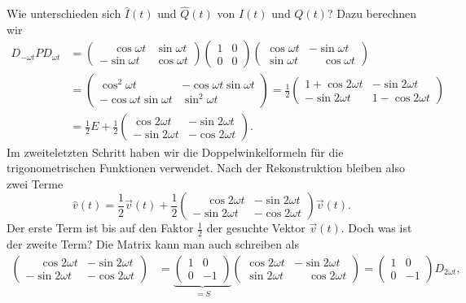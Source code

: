 Wie unterschieden sich $\hat{I}(t)$ und $\hat{Q}(t)$ von $I(t)$ und $Q(t)$?
Dazu berechnen wir
\begin{align*}
D_{-\omega t}PD_{\omega t}
&=
\begin{pmatrix}
\phantom{-}\cos\omega t & \sin\omega t \\
         - \sin\omega t & \cos\omega t
\end{pmatrix}
\begin{pmatrix} 1 & 0 \\ 0 & 0 \end{pmatrix}
\begin{pmatrix}
\cos\omega t &          - \sin\omega t \\
\sin\omega t & \phantom{-}\cos\omega t
\end{pmatrix}
\\
&=
\begin{pmatrix}
 \cos^2\omega t           & -\cos\omega t \sin\omega t \\
-\cos\omega t \sin\omega t&\sin^2\omega t
\end{pmatrix}
=
\frac12
\begin{pmatrix}
1+\cos 2\omega t &  -\sin 2\omega t \\
 -\sin 2\omega t & 1-\cos 2\omega t
\end{pmatrix}
\\
&=
\frac12 E + \frac12
\begin{pmatrix}
 \cos 2\omega t & -\sin 2\omega t \\
-\sin 2\omega t & -\cos 2\omega t
\end{pmatrix}.
\end{align*}
Im zweiteletzten Schritt haben wir die Doppelwinkelformeln für
die trigonometrischen Funktionen verwendet.
Nach der Rekonstruktion bleiben also zwei Terme
\[
\hat{v}(t)
=
\frac12\vec{v}(t)
+
\frac12
\begin{pmatrix}
\phantom{-}\cos 2\omega t & -\sin 2\omega t \\
         - \sin 2\omega t & -\cos 2\omega t
\end{pmatrix}\vec{v}(t).
\]
Der erste Term ist bis auf den Faktor $\frac12$ der gesuchte
Vektor $\vec{v}(t)$.
Doch was ist der zweite Term?
Die Matrix kann man auch schreiben als
\begin{align*}
\begin{pmatrix}
\phantom{-}\cos2\omega t&-\sin2\omega t\\
         - \sin2\omega t&-\cos2\omega t
\end{pmatrix}
&=
\underbrace{
\begin{pmatrix}
1& 0\\
0&-1
\end{pmatrix}}_{\displaystyle = S}
\begin{pmatrix}
\cos2\omega t &          - \sin2\omega t \\
\sin2\omega t & \phantom{-}\cos2\omega t
\end{pmatrix}
=
\begin{pmatrix}
1& 0\\
0&-1
\end{pmatrix}
D_{2\omega t},
\end{align*}
